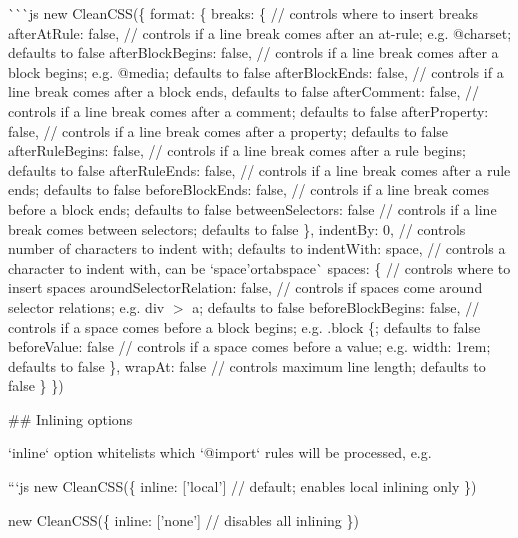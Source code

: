 \`{}\`{}\`{}js new Clean\+C\+SS(\{ format\+: \{ breaks\+: \{ // controls where to insert breaks after\+At\+Rule\+: false, // controls if a line break comes after an at-\/rule; e.\+g. {\ttfamily @charset}; defaults to {\ttfamily false} after\+Block\+Begins\+: false, // controls if a line break comes after a block begins; e.\+g. {\ttfamily @media}; defaults to {\ttfamily false} after\+Block\+Ends\+: false, // controls if a line break comes after a block ends, defaults to {\ttfamily false} after\+Comment\+: false, // controls if a line break comes after a comment; defaults to {\ttfamily false} after\+Property\+: false, // controls if a line break comes after a property; defaults to {\ttfamily false} after\+Rule\+Begins\+: false, // controls if a line break comes after a rule begins; defaults to {\ttfamily false} after\+Rule\+Ends\+: false, // controls if a line break comes after a rule ends; defaults to {\ttfamily false} before\+Block\+Ends\+: false, // controls if a line break comes before a block ends; defaults to {\ttfamily false} between\+Selectors\+: false // controls if a line break comes between selectors; defaults to {\ttfamily false} \}, indent\+By\+: 0, // controls number of characters to indent with; defaults to {} indent\+With\+: \textquotesingle{}space\textquotesingle{}, // controls a character to indent with, can be `\textquotesingle{}space'{\ttfamily or}\textquotesingle{}tab\textquotesingle{}space\textquotesingle{}\`{} spaces\+: \{ // controls where to insert spaces around\+Selector\+Relation\+: false, // controls if spaces come around selector relations; e.\+g. {\ttfamily div $>$ a}; defaults to {\ttfamily false} before\+Block\+Begins\+: false, // controls if a space comes before a block begins; e.\+g. {\ttfamily .block \{}; defaults to {\ttfamily false} before\+Value\+: false // controls if a space comes before a value; e.\+g. {\ttfamily width\+: 1rem}; defaults to {\ttfamily false} \}, wrap\+At\+: false // controls maximum line length; defaults to {\ttfamily false} \} \}) 
\begin{DoxyCode}
## Inlining options

`inline` option whitelists which `@import` rules will be processed, e.g.

```js
new CleanCSS(\{
  inline: ['local'] // default; enables local inlining only
\})
\end{DoxyCode}



\begin{DoxyCode}
new CleanCSS(\{
  inline: ['none'] // disables all inlining
\})
\end{DoxyCode}



